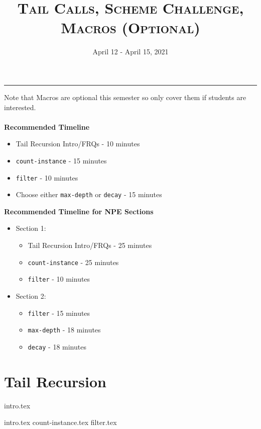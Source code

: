\documentclass{exam}
\title{\textsc{Tail Calls, Scheme Challenge, Macros (Optional)}}
\date{April 12 - April 15, 2021}
\begin{document}
\maketitle
\rule{\textwidth}{0.15em}
\fontsize{12}{15}\selectfont

\begin{guide}
\begin{blocksection}
    Note that Macros are optional this semester so only cover them if students are interested.
    \\ \\
    \textbf{Recommended Timeline}
    \begin{itemize}
        \item Tail Recursion Intro/FRQs - 10 minutes
        \item \lstinline{count-instance} - 15 minutes
        \item \lstinline{filter} - 10 minutes
        \item Choose either \lstinline{max-depth} or \lstinline{decay} - 15 minutes
    \end{itemize}
    \vspace{.5cm}
    \textbf{Recommended Timeline for NPE Sections}
    \begin{itemize}
        \item Section 1:
            \begin{itemize}
                \item Tail Recursion Intro/FRQs - 25 minutes
                \item \lstinline{count-instance} - 25 minutes
                \item \lstinline{filter} - 10 minutes
            \end{itemize}
        \item Section 2:
            \begin{itemize}
                \item \lstinline{filter} - 15 minutes
                \item \lstinline{max-depth} - 18 minutes
                \item \lstinline{decay} - 18 minutes
            \end{itemize}
    \end{itemize}
\end{blocksection}
\newpage
\end{guide}

\section{Tail Recursion}
{intro.tex}
\begin{questions}
{intro.tex}
{count-instance.tex}
{filter.tex}
\end{questions}
\end{document}
